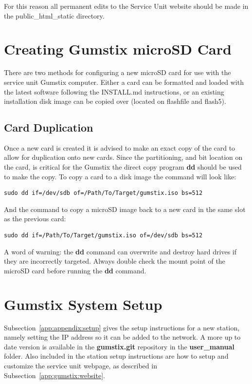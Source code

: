 \documentclass[12pt, letterpaper, onecolumn, oneside]{article}
\begin{document}
For this reason all permanent edits to the Service Unit website should be made in the public\_html\_static directory.

\section{Creating Gumstix microSD Card}

There are two methods for configuring a new microSD card for use with the service unit Gumstix computer.
Either a card can be formatted and loaded with the latest software following the INSTALL.md instructions, or an existing installation disk image can be copied over (located on flashfile and flash5).

\subsection{Card Duplication}
\label{app:gumstix:duplication}

Once a new card is created it is advised to make an exact copy of the card to allow for duplication onto new cards.
Since the partitioning, and bit location on the card, is critical for the Gumstix the direct copy program {\bf dd} should be used to make the copy.
To copy a card to a disk image the command will look like:

\begin{verbatim}
sudo dd if=/dev/sdb of=/Path/To/Target/gumstix.iso bs=512
\end{verbatim}

And the command to copy a microSD image back to a new card in the same slot as the previous card:

\begin{verbatim}
sudo dd if=/Path/To/Target/gumstix.iso of=/dev/sdb bs=512
\end{verbatim}

A word of warning: the {\bf dd} command can overwrite and destroy hard drives if they are incorrectly targeted.
Always double check the mount point of the microSD card before running the {\bf dd} command.

\clearpage

\section{Gumstix System Setup}

Subsection~\ref{app:appendix:setup} gives the setup instructions for a new station, namely setting the IP address so it can be added to the network.
A more up to date version is available in the {\bf gumstix.git} repository in the {\bf user\_manual} folder.
Also included in the station setup instructions are how to setup and customize the service unit webpage, as described in Subsection~\ref{app:gumstix:website}.
\end{document}
